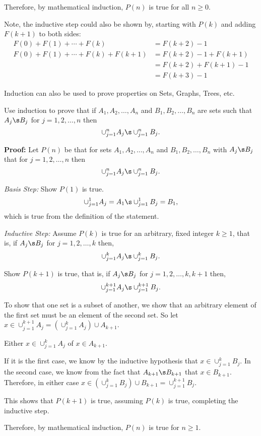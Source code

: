 \begin{questions}
\begin{solution}
  \smallskip
  Therefore, by mathematical induction, $P(n)$ is true for all $n \geq 0$.

  \smallskip
  Note, the inductive step could also be shown by, starting with $P(k)$ and adding $F(k+1)$ to both sides:
  \begin{align*}
    F(0) + F(1) + \cdots + F(k) &= F(k+2) - 1 \tag{IH} \\
    F(0) + F(1) + \cdots + F(k) + F(k+1) &= F(k+2) - 1 + F(k+1) \\
     &= F(k+2) + F(k+1) - 1 \\
     &= F(k+3) -1 
  \end{align*}
\end{solution}




\bonusquestion[4] Induction can also be used to prove properties on Sets, Graphs, Trees, etc. 


Use induction to prove that if $A_1, A_2, \ldots, A_n$ and $B_1, B_2, \ldots, B_n$ are sets such that $A_j \s B_j$ for $j =1, 2, \ldots, n$ then 
  \[ \cup_{j=1}^n A_j \s \cup_{j=1}^n B_j. \] 

\begin{solution}
  \textbf{Proof:} Let $P(n)$ be that for sets $A_1, A_2, \ldots, A_n$ and $B_1, B_2, \ldots, B_n$ with $A_j \s B_j$ that for $j =1, 2, \ldots, n$ then 
  \[ \cup_{j=1}^n A_j \s \cup_{j=1}^n B_j. \]

  \textit{Basis Step:}  Show $P(1)$ is true. 
   \[ \cup_{j=1}^1 A_j  = A_1 \s \cup_{j=1}^1 B_j = B_1, \]
   which is true from the definition of the statement. 

  \textit{Inductive Step:}  Assume $P(k)$ is true for an arbitrary, fixed integer $k \geq 1$, that is, if $A_j \s B_j$ for $j=1, 2, \ldots, k$ then, 
  \[ \cup_{j=1}^k A_j \s \cup_{j=1}^k B_j. \]

  Show $P(k+1)$ is true, that is, if $A_j \s B_j$ for $j=1, 2, \ldots, k, k+1$ then, 
  \[ \cup_{j=1}^{k+1} A_j \s \cup_{j=1}^{k+1} B_j. \]

  To show that one set is a subset of another, we show that an arbitrary element of the first set must be an element of the second set.  So let $x \in \cup_{j=1}^{k+1} A_j = \left( \cup_{j=1}^k A_j \right) \cup A_{k+1}$.  

  Either $x \in \cup_{j=1}^{k} A_j$ of $x \in A_{k+1}$.

  If it is the first case, we know by the inductive hypothesis that $x \in \cup_{j=1}^k B_j$. In the second case, we know from the fact that $A_{k+1} \s B_{k+1}$ that $x \in B_{k+1}$.  Therefore, in either case $x \in \left( \cup_{j=1}^k B_j \right) \cup B_{k+1} = \cup_{j=1}^{k+1} B_j$. 

  This shows that $P(k+1)$ is true, assuming $P(k)$ is true, completing the inductive step. 

  Therefore, by mathematical induction, $P(n)$ is true for $n \geq 1$.  
\end{solution}


\end{questions}
